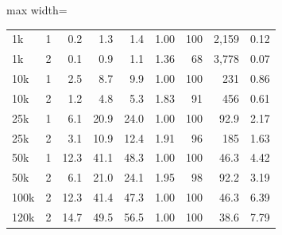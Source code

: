 \begin{table}[t]
\begin{adjustbox}{max width=\linewidth}
\begin{tabular}{lrrrrrrrr}
1k & 1 & 0.2 & 1.3 & 1.4 & 1.00 & 100 & 2,159 & 0.12 \\
1k & 2 & 0.1 & 0.9 & 1.1 & 1.36 & 68 & 3,778 & 0.07 \\
10k & 1 & 2.5 & 8.7 & 9.9 & 1.00 & 100 & 231 & 0.86 \\
10k & 2 & 1.2 & 4.8 & 5.3 & 1.83 & 91 & 456 & 0.61 \\
25k & 1 & 6.1 & 20.9 & 24.0 & 1.00 & 100 & 92.9 & 2.17 \\
25k & 2 & 3.1 & 10.9 & 12.4 & 1.91 & 96 & 185 & 1.63 \\
50k & 1 & 12.3 & 41.1 & 48.3 & 1.00 & 100 & 46.3 & 4.42 \\
50k & 2 & 6.1 & 21.0 & 24.1 & 1.95 & 98 & 92.2 & 3.19 \\
100k & 2 & 12.3 & 41.4 & 47.3 & 1.00 & 100 & 46.3 & 6.39 \\
120k & 2 & 14.7 & 49.5 & 56.5 & 1.00 & 100 & 38.6 & 7.79 \\
\bottomrule
\end{tabular}
\end{adjustbox}
\end{table}
